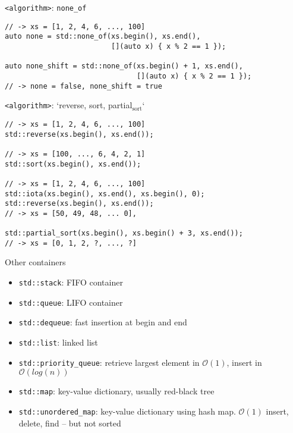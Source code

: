 \documentclass[10pt]{beamer}
\begin{document}
\begin{frame}[fragile,label={sec:orgf324a52}]{\texttt{<algorithm>}: \texttt{none\_of}}
 \begin{verbatim}
// -> xs = [1, 2, 4, 6, ..., 100]
auto none = std::none_of(xs.begin(), xs.end(),
                         [](auto x) { x % 2 == 1 });

auto none_shift = std::none_of(xs.begin() + 1, xs.end(),
                               [](auto x) { x % 2 == 1 });
// -> none = false, none_shift = true
\end{verbatim}
\end{frame}

\begin{frame}[fragile,label={sec:org8360d15}]{\texttt{<algorithm>}: `reverse, sort, partial\(_{\text{sort}}\)`}
 \begin{verbatim}
// -> xs = [1, 2, 4, 6, ..., 100]
std::reverse(xs.begin(), xs.end());

// -> xs = [100, ..., 6, 4, 2, 1]
std::sort(xs.begin(), xs.end());

// -> xs = [1, 2, 4, 6, ..., 100]
std::iota(xs.begin(), xs.end(), xs.begin(), 0);
std::reverse(xs.begin(), xs.end());
// -> xs = [50, 49, 48, ... 0], 

std::partial_sort(xs.begin(), xs.begin() + 3, xs.end());
// -> xs = [0, 1, 2, ?, ..., ?]
\end{verbatim}
\end{frame}
\begin{frame}[fragile,label={sec:org86998df}]{Other containers}
 \begin{itemize}
\item \texttt{std::stack}: FIFO container
\item \texttt{std::queue}: LIFO container
\item \texttt{std::dequeue}: fast insertion at begin and end
\item \texttt{std::list}: linked list
\item \texttt{std::priority\_queue}: retrieve largest element in \(\mathcal{O}(1)\), insert in
\(\mathcal{O}(log(n))\)
\item \texttt{std::map}: key-value dictionary, usually red-black tree
\item \texttt{std::unordered\_map}: key-value dictionary using hash map. \(\mathcal{O}(1)\)
insert, delete, find -- but not sorted
\end{itemize}
\end{frame}
\end{document}

